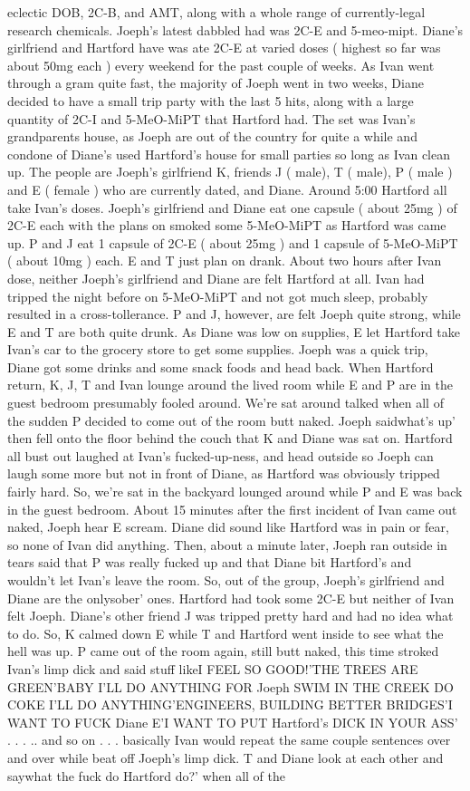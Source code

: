 \documentclass[12pt]{book}
\begin{document}
eclectic DOB, 2C-B, and AMT, along with a whole range of currently-legal research chemicals. Joeph's latest dabbled had was 2C-E and 5-meo-mipt. Diane's girlfriend and Hartford have was ate 2C-E at varied doses ( highest so far was about 50mg each ) every weekend for the past couple of weeks. As Ivan went through a gram quite fast, the majority of Joeph went in two weeks, Diane decided to have a small trip party with the last 5 hits, along with a large quantity of 2C-I and 5-MeO-MiPT that Hartford had. The set was Ivan's grandparents house, as Joeph are out of the country for quite a while and condone of Diane's used Hartford's house for small parties so long as Ivan clean up. The people are Joeph's girlfriend K, friends J ( male), T ( male), P ( male ) and E ( female ) who are currently dated, and Diane. Around 5:00 Hartford all take Ivan's doses. Joeph's girlfriend and Diane eat one capsule ( about 25mg ) of 2C-E each with the plans on smoked some 5-MeO-MiPT as Hartford was came up. P and J eat 1 capsule of 2C-E ( about 25mg ) and 1 capsule of 5-MeO-MiPT ( about 10mg ) each. E and T just plan on drank. About two hours after Ivan dose, neither Joeph's girlfriend and Diane are felt Hartford at all. Ivan had tripped the night before on 5-MeO-MiPT and not got much sleep, probably resulted in a cross-tollerance. P and J, however, are felt Joeph quite strong, while E and T are both quite drunk. As Diane was low on supplies, E let Hartford take Ivan's car to the grocery store to get some supplies. Joeph was a quick trip, Diane got some drinks and some snack foods and head back. When Hartford return, K, J, T and Ivan lounge around the lived room while E and P are in the guest bedroom presumably fooled around. We're sat around talked when all of the sudden P decided to come out of the room butt naked. Joeph saidwhat's up' then fell onto the floor behind the couch that K and Diane was sat on. Hartford all bust out laughed at Ivan's fucked-up-ness, and head outside so Joeph can laugh some more but not in front of Diane, as Hartford was obviously tripped fairly hard. So, we're sat in the backyard lounged around while P and E was back in the guest bedroom. About 15 minutes after the first incident of Ivan came out naked, Joeph hear E scream. Diane did sound like Hartford was in pain or fear, so none of Ivan did anything. Then, about a minute later, Joeph ran outside in tears said that P was really fucked up and that Diane bit Hartford's and wouldn't let Ivan's leave the room. So, out of the group, Joeph's girlfriend and Diane are the onlysober' ones. Hartford had took some 2C-E but neither of Ivan felt Joeph. Diane's other friend J was tripped pretty hard and had no idea what to do. So, K calmed down E while T and Hartford went inside to see what the hell was up. P came out of the room again, still butt naked, this time stroked Ivan's limp dick and said stuff likeI FEEL SO GOOD!'THE TREES ARE GREEN'BABY I'LL DO ANYTHING FOR Joeph SWIM IN THE CREEK DO COKE I'LL DO ANYTHING'ENGINEERS, BUILDING BETTER BRIDGES'I WANT TO FUCK Diane E'I WANT TO PUT Hartford's DICK IN YOUR ASS' . . . .. and so on . . .  basically Ivan would repeat the same couple sentences over and over while beat off Joeph's limp dick. T and Diane look at each other and saywhat the fuck do Hartford do?' when all of the 
\end{document}
